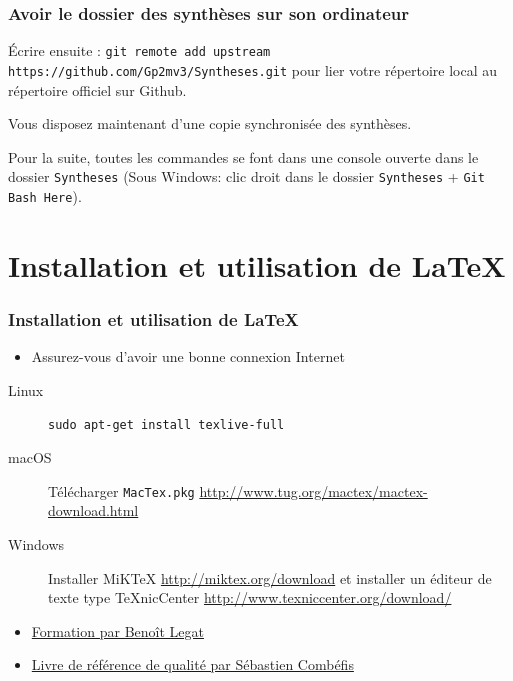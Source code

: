 \documentclass{beamer}
\newenvironment{wideitemize}{\itemize\addtolength{\itemsep}{10pt}}{\enditemize}
\begin{document}
\begin{frame}[fragile]
    \frametitle{Avoir le dossier des synthèses sur son ordinateur}
    \begin{wideitemize}
        \item Écrire ensuite : 
            \lstset{style=smallstyle}
            \lstinline[mathescape]|git remote add upstream https://github.com/Gp2mv3/Syntheses.git|
            pour lier votre répertoire local au répertoire officiel sur Github.
        \pause
        \item Vous disposez maintenant d'une copie synchronisée des synthèses. 
        \pause
        \item Pour la suite, toutes les commandes se font dans une console ouverte dans le dossier \lstinline|Syntheses| (Sous Windows: clic droit dans le dossier \lstinline|Syntheses| + \lstinline|Git Bash Here|).
    \end{wideitemize}
\end{frame}

\section{Installation et utilisation de \LaTeX}

\begin{frame}[fragile]
    \frametitle{Installation et utilisation de \LaTeX}
    \begin{itemize}
        \item Assurez-vous d'avoir une bonne connexion Internet
    \end{itemize}
    \begin{description}
        \item[Linux] \lstinline|sudo apt-get install texlive-full|
        \item[macOS] Télécharger \lstinline|MacTex.pkg|
            \url{http://www.tug.org/mactex/mactex-download.html}
        \item[Windows] Installer MiKTeX \url{http://miktex.org/download}
            et installer un éditeur de texte type TeXnicCenter
            \url{http://www.texniccenter.org/download/}
    \end{description}
    \begin{itemize}
        \item
            \href{https://github.com/blegat/LaTeXconf/blob/master/main.pdf}{Formation
            par Benoît Legat}
        \item
            \href{http://www.latex-howto.be/files/LaTeX-HowTo-full.pdf}{Livre
            de référence de qualité par Sébastien Combéfis}
    \end{itemize}
\end{frame}
\end{document}
